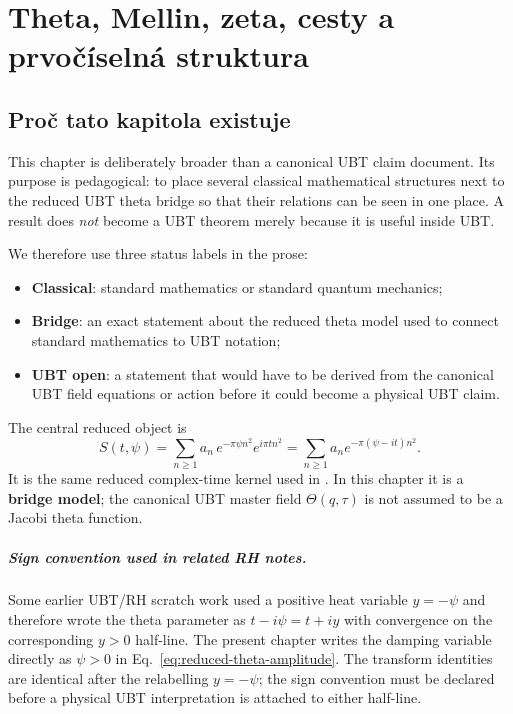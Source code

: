 
\chapter{Theta, Mellin, zeta, cesty a prvočíselná struktura}
\label{ch:theta-mellin-feynman}

\section{Proč tato kapitola existuje}

This chapter is deliberately broader than a canonical UBT claim document.  Its purpose is
pedagogical: to place several classical mathematical structures next to the reduced UBT
theta bridge so that their relations can be seen in one place.  A result does \emph{not}
become a UBT theorem merely because it is useful inside UBT.

We therefore use three status labels in the prose:
\begin{itemize}
  \item \textbf{Classical}: standard mathematics or standard quantum mechanics;
  \item \textbf{Bridge}: an exact statement about the reduced theta model used to connect
        standard mathematics to UBT notation;
  \item \textbf{UBT open}: a statement that would have to be derived from the canonical
        UBT field equations or action before it could become a physical UBT claim.
\end{itemize}

The central reduced object is
\begin{equation}
  S(t,\psi)
  = \sum_{n\ge 1} a_n\,e^{-\pi\psi n^2}e^{i\pi t n^2}
  = \sum_{n\ge1}a_n e^{-\pi(\psi-it)n^2}.
  \label{eq:reduced-theta-amplitude}
\end{equation}
It is the same reduced complex-time kernel used in
.  In this chapter it is a
\textbf{bridge model}; the canonical UBT master field $\Theta(q,\tau)$ is not assumed to
be a Jacobi theta function.

\paragraph{Sign convention used in related RH notes.}
Some earlier UBT/RH scratch work used a positive heat variable $y=-\psi$ and therefore
wrote the theta parameter as $t-i\psi=t+iy$ with convergence on the corresponding
$y>0$ half-line.  The present chapter writes the damping variable directly as $\psi>0$
in Eq.~\eqref{eq:reduced-theta-amplitude}.  The transform identities are identical after
the relabelling $y=-\psi$; the sign convention must be declared before a physical UBT
interpretation is attached to either half-line.

